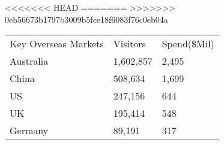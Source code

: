 <<<<<<< HEAD
=======
>>>>>>> 0eb56673b1797b3009b5fce18f6083f76c0eb04a
\begin{tabular}[t]{p{5.4cm}p{0.9cm}p{1.2cm}}
 Key Overseas Markets & Visitors & Spend(\$Mil) \\ 
 Australia & 1,602,857 & 2,495 \\ 
  China &   508,634 & 1,699 \\ 
  US &   247,156 & 644 \\ 
  UK &   195,414 & 548 \\ 
  Germany &    89,191 & 317 \\ 
  \end{tabular}
